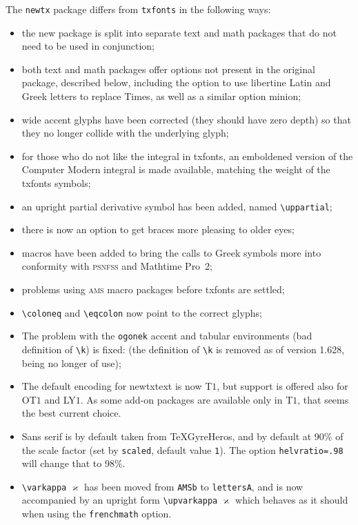 \documentclass[11pt]{article}
\theoremstyle{oldplain}
\theoremstyle{plain}
\begin{document}
The {\tt newtx} package differs from {\tt txfonts} in the following ways:
\begin{itemize}
\item
the new package is split into separate text and math packages that do not need to be used in conjunction;
\item both text and math packages offer options not present in the original package, described below, including the option to use \textsf{libertine} Latin and Greek letters to replace \textsf{Times}, as well as a similar option \textsf{minion};
\item wide accent glyphs have been corrected (they should have zero depth) so that they no longer collide with the underlying glyph;
\item for those who do not like the integral in \textsf{txfonts}, an emboldened version of the Computer Modern integral is made available, matching the weight of the \textsf{txfonts} symbols;
\item an upright partial derivative symbol has been added, named \verb|\uppartial|;
\item there is now an option to get braces more pleasing to older eyes;
\item macros have been added to bring the calls to Greek symbols more into conformity with \textsc{psnfss} and Mathtime Pro~2;
\item problems using \textsc{ams} macro packages before \textsf{txfonts} are settled;
\item \verb|\coloneq| and \verb|\eqcolon| now point to the correct glyphs;
\item The problem with the {\tt ogonek} accent  and tabular environments (bad definition of \verb|\k|) is fixed: (the definition of \verb|\k| is removed as of version 1.628, being no longer of use);
\item The default encoding for \textsf{newtxtext} is now T$1$, but support is offered also for OT$1$ and LY$1$. As some add-on packages are available only in T$1$, that seems the best current choice.
\item Sans serif is by default taken from TeXGyreHeros, and by default at 90\% of the scale factor (set by {\tt scaled}, default value {\tt1}). The option {\tt helvratio=.98} will change that to 98\%.
\item \verb|\varkappa| $\varkappa$ has been moved from {\tt AMSb} to {\tt lettersA}, and is now accompanied by an upright form \verb|\upvarkappa| $\upvarkappa$ which behaves as it should when using the {\tt frenchmath} option.
\end{itemize}
\end{document}
